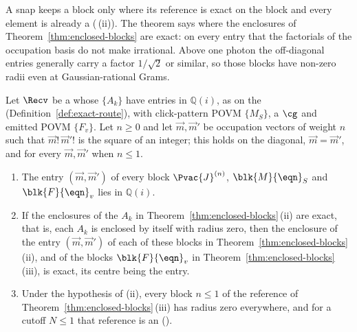 
A snap keeps a block only where its reference is exact on the block and
every element is already a 
(\,(ii)). The theorem says where the
enclosures of Theorem~\ref{thm:enclosed-blocks} are exact: on every entry
that the factorials of the occupation basis do not make irrational. Above one
photon the off-diagonal entries generally carry a factor $1/\sqrt2$ or
similar, so those blocks have non-zero radii even at Gaussian-rational
Grams.

\begin{theorem}\label{thm:exact-blocks}
Let $\Recv$ be a  whose
 $\{A_k\}$ have entries in
$\mathbb{Q}(i)$, as on the 
(Definition~\ref{def:exact-route}), with click-pattern POVM $\{M_S\}$, a
 $\cg$ and emitted POVM $\{F_v\}$. Let $n\ge0$
and let $\vec m,\vec m'$ be occupation vectors of weight $n$ such that
$\vec m!\,\vec m'!$ is the square of an integer; this holds on the diagonal,
$\vec m=\vec m'$, and for every $\vec m,\vec m'$ when $n\le1$.
\begin{enumerate}[label=(\roman*),leftmargin=3.0em]
\item The entry $(\vec m,\vec m')$ of every block $\Pvac{J}^{(n)}$,
  $\blk{M}{\eqn}_S$ and $\blk{F}{\eqn}_v$ lies in $\mathbb{Q}(i)$.
\item If the enclosures of the $A_k$ in Theorem~\ref{thm:enclosed-blocks}\,(ii)
  are exact, that is, each $A_k$ is enclosed by itself with radius zero,
  then the enclosure of the entry $(\vec m,\vec m')$ of each of these blocks
  in Theorem~\ref{thm:enclosed-blocks}\,(ii), and of the blocks
  $\blk{F}{\eqn}_v$ in Theorem~\ref{thm:enclosed-blocks}\,(iii), is exact,
  its centre being the entry.
\item Under the hypothesis of (ii), every block $n\le1$ of the reference of
  Theorem~\ref{thm:enclosed-blocks}\,(iii) has radius zero everywhere, and for
  a cutoff $N\le1$ that reference is an 
  ().
\end{enumerate}
\end{theorem}

